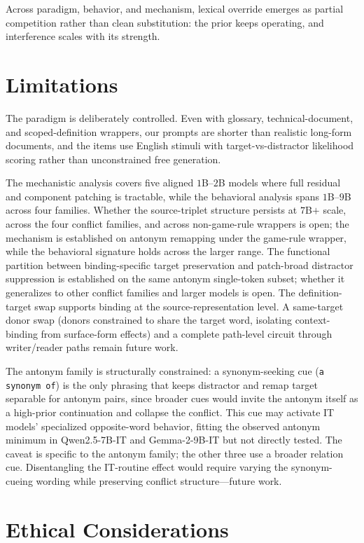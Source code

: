 \documentclass[11pt]{article}
\begin{document}
Across paradigm, behavior, and mechanism, lexical override emerges as partial competition
rather than clean substitution: the prior keeps operating, and interference scales with its
strength.

\section*{Limitations}

The paradigm is deliberately controlled. Even with glossary, technical-document, and
scoped-definition wrappers, our prompts are shorter than realistic long-form documents, and
the items use English stimuli with target-vs-distractor likelihood scoring rather than
unconstrained free generation.

The mechanistic analysis covers five aligned $1$B--$2$B models where full residual and
component patching is tractable, while the behavioral analysis spans $1$B--$9$B across four
families. Whether the source-triplet structure persists at $7$B$+$ scale, across the four
conflict families, and across non-game-rule wrappers is open; the mechanism is established
on antonym remapping under the game-rule wrapper, while the behavioral signature holds across
the larger range. The functional partition between binding-specific target preservation and
patch-broad distractor suppression is established on the same antonym single-token subset;
whether it generalizes to other conflict families and larger models is open. The
definition-target swap supports binding at the source-representation level. A same-target
donor swap (donors constrained to share the target word, isolating context-binding from
surface-form effects) and a complete path-level circuit through writer/reader paths remain
future work.

The antonym family is structurally constrained: a synonym-seeking cue (\texttt{a synonym of})
is the only phrasing that keeps distractor and remap target separable for antonym pairs,
since broader cues would invite the antonym itself as a high-prior continuation and collapse
the conflict. This cue may activate IT models' specialized opposite-word behavior, fitting
the observed antonym minimum in Qwen2.5-7B-IT and Gemma-2-9B-IT but not directly tested.
The caveat is specific to the antonym family; the other three use a broader relation cue.
Disentangling the IT-routine effect would require varying the synonym-cueing wording while
preserving conflict structure---future work.

\section*{Ethical Considerations}
\end{document}

